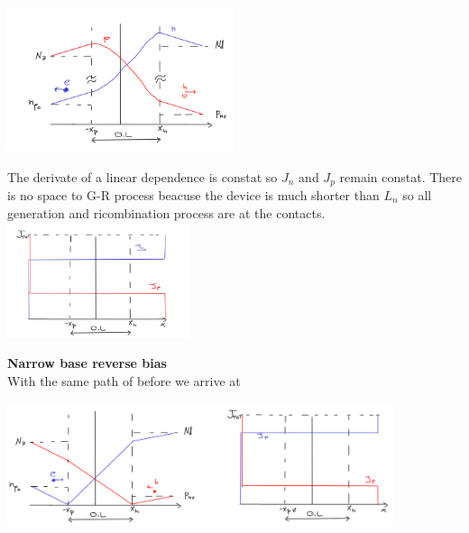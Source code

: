 \centering
\includegraphics[width=0.5\textwidth]{nbfb.png}\\
\raggedright

The derivate of a linear dependence is constat so $J_n$ and $J_p$ remain constat. There is no space to G-R process beacuse the device is much shorter than $L_n$ so all generation and ricombination process are at the contacts.\\


\centering
\includegraphics[width=0.4\textwidth]{nbJf.png}\\
\raggedright

{\bf Narrow base reverse bias}\\
With the same path of before we arrive at

\centering
\includegraphics[width=0.85\textwidth]{nwall.png}\\
\raggedright

\centering
{}
\raggedright


